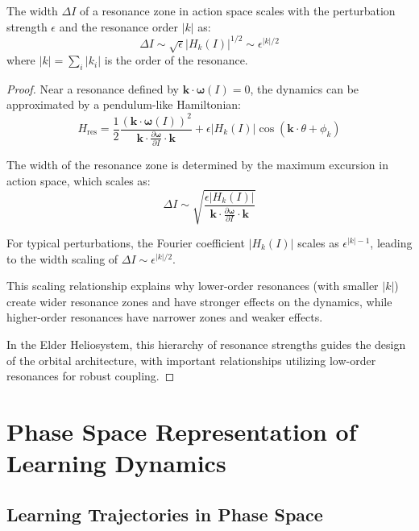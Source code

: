 \begin{theorem}
The width $\Delta I$ of a resonance zone in action space scales with the perturbation strength $\epsilon$ and the resonance order $|k|$ as:
\begin{equation}
\Delta I \sim \sqrt{\epsilon} |H_k(I)| ^{1/2} \sim \epsilon^{|k|/2}
\end{equation}
where $|k| = \sum_i |k_i|$ is the order of the resonance.
\end{theorem}

\begin{proof}
Near a resonance defined by $\mathbf{k} \cdot \boldsymbol{\omega}(I) = 0$, the dynamics can be approximated by a pendulum-like Hamiltonian:
\begin{equation}
H_{\text{res}} = \frac{1}{2} \frac{(\mathbf{k} \cdot \boldsymbol{\omega}(I))^2}{\mathbf{k} \cdot \frac{\partial \boldsymbol{\omega}}{\partial I} \cdot \mathbf{k}} + \epsilon |H_k(I)| \cos(\mathbf{k} \cdot \theta + \phi_k)
\end{equation}

The width of the resonance zone is determined by the maximum excursion in action space, which scales as:
\begin{equation}
\Delta I \sim \sqrt{\frac{\epsilon |H_k(I)|}{\mathbf{k} \cdot \frac{\partial \boldsymbol{\omega}}{\partial I} \cdot \mathbf{k}}}
\end{equation}

For typical perturbations, the Fourier coefficient $|H_k(I)|$ scales as $\epsilon^{|k|-1}$, leading to the width scaling of $\Delta I \sim \epsilon^{|k|/2}$.

This scaling relationship explains why lower-order resonances (with smaller $|k|$) create wider resonance zones and have stronger effects on the dynamics, while higher-order resonances have narrower zones and weaker effects.

In the Elder Heliosystem, this hierarchy of resonance strengths guides the design of the orbital architecture, with important relationships utilizing low-order resonances for robust coupling.
\end{proof}

\section{Phase Space Representation of Learning Dynamics}

\subsection{Learning Trajectories in Phase Space}

